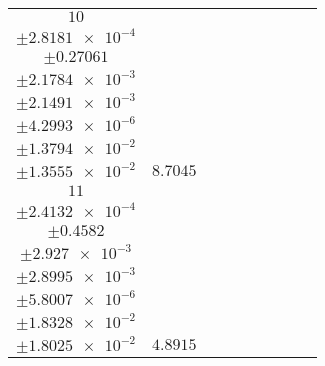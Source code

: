 \documentclass[8pt]{article}
\begin{document}
\begin{longtable}[l]{c c c c c c c c c}
$\num{10}$ & \begin{tabular}[c]{@{}c@{}}$\num{5.9353e-2}$ \\ $\pm\num{2.8181e-4}$\end{tabular} & \begin{tabular}[c]{@{}c@{}}$\num{0.69109}$ \\ $\pm\num{0.27061}$\end{tabular} & \begin{tabular}[c]{@{}c@{}}$\num{-4.2169}$ \\ $\pm\num{2.1784e-3}$\end{tabular} & \begin{tabular}[c]{@{}c@{}}$\num{2.1392e+3}$ \\ $\pm\num{2.1491e-3}$\end{tabular} & \begin{tabular}[c]{@{}c@{}}$\num{4.2796}$ \\ $\pm\num{4.2993e-6}$\end{tabular} & \begin{tabular}[c]{@{}c@{}}$\num{2.5108}$ \\ $\pm\num{1.3794e-2}$\end{tabular} & \begin{tabular}[c]{@{}c@{}}$\num{2.4459}$ \\ $\pm\num{1.3555e-2}$\end{tabular} & $\num{8.7045}$\\
$\num{11}$ & \begin{tabular}[c]{@{}c@{}}$\num{3.0418e-2}$ \\ $\pm\num{2.4132e-4}$\end{tabular} & \begin{tabular}[c]{@{}c@{}}$\num{0.11048}$ \\ $\pm\num{0.4582}$\end{tabular} & \begin{tabular}[c]{@{}c@{}}$\num{-0.90839}$ \\ $\pm\num{2.927e-3}$\end{tabular} & \begin{tabular}[c]{@{}c@{}}$\num{2.1425e+3}$ \\ $\pm\num{2.8995e-3}$\end{tabular} & \begin{tabular}[c]{@{}c@{}}$\num{4.2862}$ \\ $\pm\num{5.8007e-6}$\end{tabular} & \begin{tabular}[c]{@{}c@{}}$\num{2.0666}$ \\ $\pm\num{1.8328e-2}$\end{tabular} & \begin{tabular}[c]{@{}c@{}}$\num{1.9733}$ \\ $\pm\num{1.8025e-2}$\end{tabular} & $\num{4.8915}$\\

\end{longtable}
\end{document}
